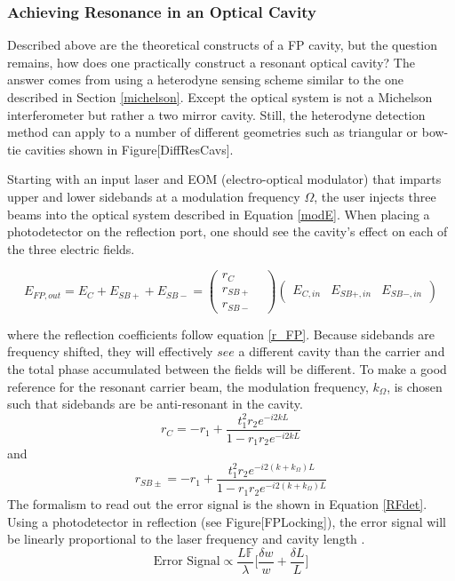 		\subsubsection{Achieving Resonance in an Optical Cavity}
		Described above are the theoretical constructs of a FP cavity, but the question remains, how does one practically construct a resonant optical cavity?  The answer comes from using a heterodyne sensing scheme similar to the one described in Section \ref{michelson}.  Except the optical system is not a Michelson interferometer but rather a two mirror cavity.  Still, the heterodyne detection method can apply to a number of different geometries such as triangular or bow-tie cavities shown in Figure[DiffResCavs].
		
		Starting with an input laser and EOM (electro-optical modulator) that imparts upper and lower sidebands at a modulation frequency $\Omega$, the user injects three beams into the optical system described in Equation \ref{modE}.  When placing a photodetector on the reflection port, one should see the cavity's effect on each of the three electric fields.
		
		\begin{equation}
		E_{FP,out} = E_{C} + E_{SB+} + E_{SB-} = 
		\begin{pmatrix}
		r_{C} 	&   
		\\ 	r_{SB+} &
		\\ 	r_{SB-} &
		\end{pmatrix}
		\begin{pmatrix}
		E_{C,in} &    E_{SB+,in}    &  E_{SB-,in}     
		\end{pmatrix}
		\end{equation}
		
		where the reflection coefficients follow equation \ref{r_FP}.  Because sidebands are frequency shifted, they will effectively $see$ a different cavity than the carrier and the total phase accumulated between the fields will be different. To make a good reference for the resonant carrier beam, the modulation frequency, $k_{\Omega}$, is chosen such that sidebands are be anti-resonant in the cavity.  
		\begin{equation}
		r_{C} = -r_1 + \frac{t_1^2 r_2  e^{-i2kL}}{1-r_1 r_2 e^{-i2kL}}
		\end{equation}
		and 	
		\begin{equation}
		r_{SB\pm} = -r_1 + \frac{t_1^2 r_2  e^{-i2(k+k_{\Omega})L}}{1-r_1 r_2 e^{-i2(k+k_{\Omega})L}}
		\end{equation}
		The formalism to read out the error signal is the shown in Equation \ref{RFdet}. Using a photodetector in reflection (see Figure[FPLocking]), the error signal will be linearly proportional to the laser frequency and cavity length \cite{BlackPDH}.
		\begin{equation}
		\text{Error Signal} \propto \frac{L \mathbb{F}}{\lambda} \bigg[\frac{\delta w}{w} + \frac{\delta L}{L}\bigg]
		\end{equation}

